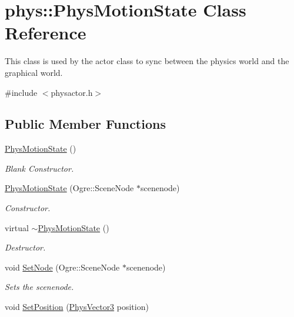 \hypertarget{classphys_1_1PhysMotionState}{
\section{phys::PhysMotionState Class Reference}
\label{dc/d0d/classphys_1_1PhysMotionState}
}


This class is used by the actor class to sync between the physics world and the graphical world.  




{\ttfamily \#include $<$physactor.h$>$}

\subsection*{Public Member Functions}
\begin{DoxyCompactItemize}
\item 
\hyperlink{classphys_1_1PhysMotionState_ac685ae94d7ee7740aaee8c1a1132b27a}{PhysMotionState} ()
\begin{DoxyCompactList}\small\item\em Blank Constructor. \item\end{DoxyCompactList}\item 
\hyperlink{classphys_1_1PhysMotionState_a505aa5ea3bbaba4710924f030f4ed008}{PhysMotionState} (Ogre::SceneNode $\ast$scenenode)
\begin{DoxyCompactList}\small\item\em Constructor. \item\end{DoxyCompactList}\item 
virtual \hyperlink{classphys_1_1PhysMotionState_a20798e3dce2d71a938c3607a8610eaac}{$\sim$PhysMotionState} ()
\begin{DoxyCompactList}\small\item\em Destructor. \item\end{DoxyCompactList}\item 
void \hyperlink{classphys_1_1PhysMotionState_a034376e768543b377430611dff323412}{SetNode} (Ogre::SceneNode $\ast$scenenode)
\begin{DoxyCompactList}\small\item\em Sets the scenenode. \item\end{DoxyCompactList}\item 
void \hyperlink{classphys_1_1PhysMotionState_a083029e5dbcfafd573d47331ff8660cb}{SetPosition} (\hyperlink{classPhysVector3}{PhysVector3} position)

\end{DoxyCompactItemize}
